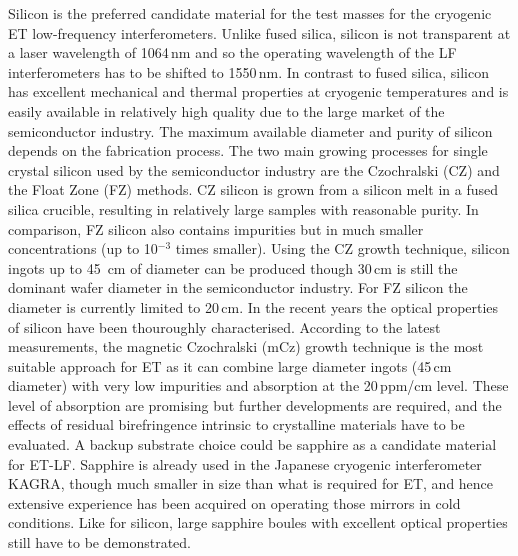 Silicon is the preferred candidate material for the test masses for the cryogenic ET low-frequency interferometers. 
Unlike fused silica, silicon is not transparent at a laser wavelength of 1064\,nm and so the operating wavelength of the LF interferometers has to be shifted to 1550\,nm. 
In contrast to fused silica, silicon has excellent mechanical and thermal properties at cryogenic temperatures and is easily available in relatively high quality due to the large market of the semiconductor industry.
%
The maximum available diameter and purity of silicon depends on the fabrication
process. The two main growing processes for single crystal silicon used by the
semiconductor industry are the Czochralski (CZ) and the Float Zone (FZ) methods.
CZ silicon is grown from a silicon melt in a fused silica crucible, resulting in relatively large samples with reasonable purity. 
In comparison, FZ silicon also contains impurities but in much smaller concentrations (up to 10$^{-3}$ times smaller). 
Using the CZ growth technique, silicon ingots up to 45~cm of diameter can be produced though 30\,cm is still the dominant wafer diameter in the semiconductor industry. For FZ silicon the diameter is currently limited to 20\,cm.
In the recent years the optical properties of silicon have been thouroughly characterised. According to the latest measurements, the magnetic Czochralski (mCz) growth technique is the most suitable approach for ET as it can combine large diameter ingots (45\,cm diameter) with very low impurities and absorption at the 20\,ppm/cm level. These level of absorption are promising but further developments are required, and the effects of residual birefringence intrinsic to crystalline materials have to be evaluated.
A backup substrate choice could be sapphire as a candidate material for ET-LF. Sapphire is already used in the Japanese cryogenic interferometer KAGRA, though much smaller in size than what is required for ET, and hence extensive experience has been acquired on operating those mirrors  in cold conditions.%
Like for silicon, large sapphire boules with excellent optical properties still have to be demonstrated.

